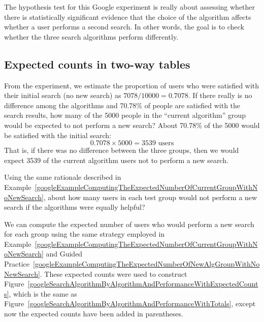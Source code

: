 The hypothesis test for this Google experiment is really about assessing whether there is statistically significant evidence that the choice of the algorithm affects whether a user performs a second search. In other words, the goal is to check whether the three search algorithms perform differently.


\D{\newpage}

\subsection{Expected counts in two-way tables}

\begin{examplewrap}
\begin{nexample}{From the experiment, we estimate the proportion of users who were satisfied with their initial search (no new search) as $7078/10000 = 0.7078$. If there really is no difference among the algorithms and 70.78\% of people are satisfied with the search results, how many of the 5000 people in the ``current algorithm'' group would be expected to not perform a new search?} \label{googleExampleComputingTheExpectedNumberOfCurrentGroupWithNoNewSearch}
About 70.78\% of the 5000 would be satisfied with the initial search:
$$ 0.7078\times 5000 = 3539\text{ users} $$
That is, if there was no difference between the three groups, then we would expect 3539 of the current algorithm users not to perform a new search.
\end{nexample}
\end{examplewrap}

\begin{exercisewrap}
\begin{nexercise}\label{googleExampleComputingTheExpectedNumberOfNewAlgGroupWithNoNewSearch}
Using the same rationale described in Example~\ref{googleExampleComputingTheExpectedNumberOfCurrentGroupWithNoNewSearch}, about how many users in each test group would not perform a new search if the algorithms were equally helpful?\footnotemark
\end{nexercise}
\end{exercisewrap}

We can compute the expected number of users who would perform a new search for each group using the same strategy employed in Example~\ref{googleExampleComputingTheExpectedNumberOfCurrentGroupWithNoNewSearch} and Guided Practice~\ref{googleExampleComputingTheExpectedNumberOfNewAlgGroupWithNoNewSearch}. These expected counts were used to construct Figure~\ref{googleSearchAlgorithmByAlgorithmAndPerformanceWithExpectedCounts}, which is the same as Figure~\ref{googleSearchAlgorithmByAlgorithmAndPerformanceWithTotals}, except now the expected counts have been added in parentheses.

